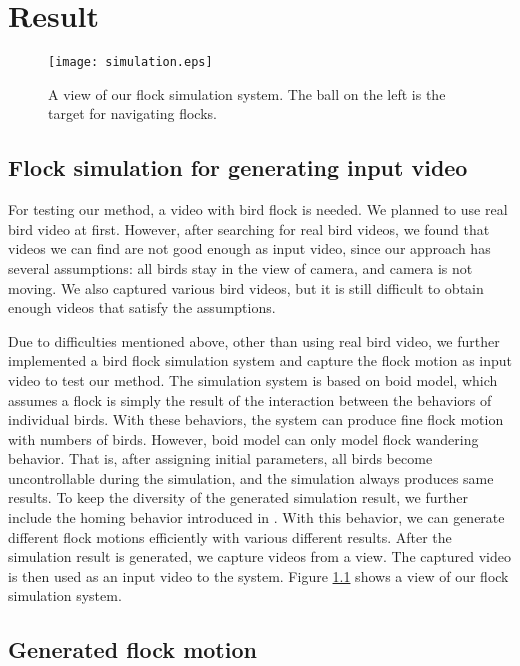 \chapter{Result}


\begin{figure}[h]
 \begin{center}
  \texttt{[image: simulation.eps]}
 \end{center}
 \caption{A view of our flock simulation system. The ball on the left is the target for navigating flocks.}
 \label{figure:simulation}
\end{figure}


\section{Flock simulation for generating input video}


For testing our method, a video with bird flock is needed. We planned to use real bird video at first. However, after searching for real bird videos, we found that videos we can find are not good enough as input video, since our approach has several assumptions: all birds stay in the view of camera, and camera is not moving. We also captured various bird videos, but it is still difficult to obtain enough videos that satisfy the assumptions.


Due to difficulties mentioned above, other than using real bird video, we further implemented a bird flock simulation system and capture the flock motion as input video to test our method. The simulation system is based on boid model, which assumes a flock is simply the result of the interaction between the behaviors of individual birds. With these behaviors, the system can produce fine flock motion with numbers of birds. However, boid model can only model flock wandering behavior. That is, after assigning initial parameters, all birds become uncontrollable during the simulation, and the simulation always produces same results. To keep the diversity of the generated simulation result, we further include the homing behavior introduced in \cite{Shape,OB1}. With this behavior, we can generate different flock motions efficiently with various different results. After the simulation result is generated, we capture videos from a view. The captured video is then used as an input video to the system. Figure \ref{figure:simulation} shows a view of our flock simulation system.


\section{Generated flock motion}


